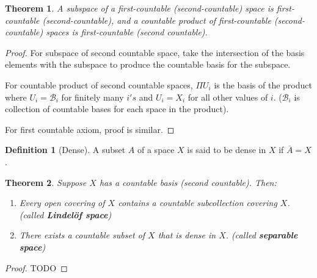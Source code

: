 \documentclass[12pt,reqno]{amsart}
\theoremstyle{plain}
\newtheorem{thm}{Theorem}
\theoremstyle{definition}
\newtheorem{defn}{Definition}
\newcommand{\cal}[1]{\mathcal{#1}}
\begin{document}
\begin{thm}
    A subspace of a first-countable (second-countable) space is first-countable (second-countable), and a countable product of first-countable (second-countable) spaces is first-countable (second countable).
\end{thm}
\begin{proof}
    For subspace of second countable space, take the intersection of the basis elements with the subspace to produce the countable basis for the subspace. 

    For countable product of second countable spaces, $\Pi U_i$ is the basis of the product where $U_i = \cal B_i$ for finitely many $i's$ and $U_i = X_i$ for all other values of $i$. ($\cal B_i$ is collection of countable bases for each space in the product).

    For first countable axiom, proof is similar.
\end{proof}

\begin{defn}[Dense]
    A subset $A$ of a space $X$ is said to be dense in $X$ if $\overline{A} = X$.
\end{defn}
\begin{thm}
    Suppose $X$ has a countable basis (second countable). Then:
    \begin{enumerate}
        \item Every open covering of $X$ contains a countable subcollection covering $X$. (called {\bf Lindel\"{o}f space})
        \item There exists a countable subset of $X$ that is dense in $X$. (called {\bf separable space})
    \end{enumerate}
\end{thm}
\begin{proof}
    TODO
\end{proof}
\end{document}
